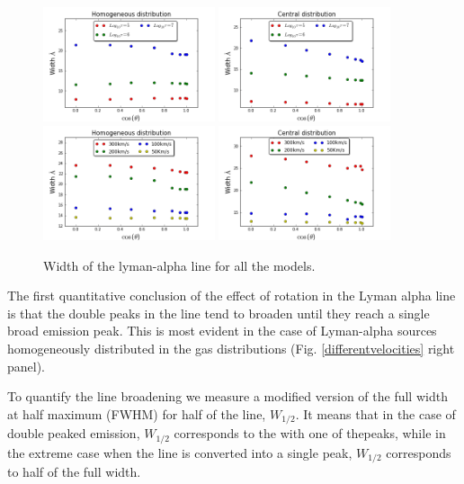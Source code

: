 \documentclass[usenatbib]{mn2e}
\begin{document}
\begin{figure}
    \includegraphics[width=0.45\textwidth]{WidthvsThetaDifODHOM.png}
    \includegraphics[width=0.45\textwidth]{WidthvsThetaDifOD.png}
    \includegraphics[width=0.45\textwidth]{WidthvsThetaDifSpeedsHOM.png}
    \includegraphics[width=0.45\textwidth]{WidthvsThetaDifSpeeds.png}
\caption{Width of the lyman-alpha line for all the models. 
  \label{figure:widthvstheta}
}
\end{figure}

The first quantitative conclusion of the effect of rotation in the
Lyman alpha line is that the double peaks in the line tend to broaden
until they reach a single broad emission peak. This is most evident in
the case of Lyman-alpha sources homogeneously distributed in the gas
distributions (Fig. \ref{differentvelocities} right panel).

To quantify the line broadening we measure a modified version of the full
width at half maximum (FWHM) for half of the line, $W_{1/2}$. It means that in
the case of double peaked emission, $W_{1/2}$ corresponds to the with
one of thepeaks, while in the extreme case when the line is converted
into a single peak, $W_{1/2}$ corresponds to half of the full width. 
\end{document}

